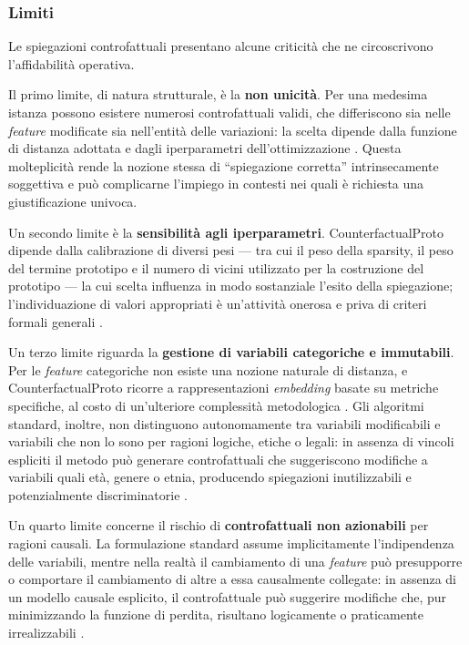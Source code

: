 \subsubsection{Limiti}

Le spiegazioni controfattuali presentano alcune criticità che ne circoscrivono l'affidabilità operativa.

Il primo limite, di natura strutturale, è la \textbf{non unicità}. Per una medesima istanza possono esistere numerosi controfattuali validi, che differiscono sia nelle \textit{feature} modificate sia nell'entità delle variazioni: la scelta dipende dalla funzione di distanza adottata e dagli iperparametri dell'ottimizzazione \cite{vanlooveren2021counterfactualproto, wachter2017counterfactual}. Questa molteplicità rende la nozione stessa di ``spiegazione corretta'' intrinsecamente soggettiva e può complicarne l'impiego in contesti nei quali è richiesta una giustificazione univoca.

Un secondo limite è la \textbf{sensibilità agli iperparametri}. CounterfactualProto dipende dalla calibrazione di diversi pesi --- tra cui il peso della sparsity, il peso del termine prototipo e il numero di vicini utilizzato per la costruzione del prototipo --- la cui scelta influenza in modo sostanziale l'esito della spiegazione; l'individuazione di valori appropriati è un'attività onerosa e priva di criteri formali generali \cite{vanlooveren2021counterfactualproto}.

Un terzo limite riguarda la \textbf{gestione di variabili categoriche e immutabili}. Per le \textit{feature} categoriche non esiste una nozione naturale di distanza, e CounterfactualProto ricorre a rappresentazioni \textit{embedding} basate su metriche specifiche, al costo di un'ulteriore complessità metodologica \cite{vanlooveren2021counterfactualproto}. Gli algoritmi standard, inoltre, non distinguono autonomamente tra variabili modificabili e variabili che non lo sono per ragioni logiche, etiche o legali: in assenza di vincoli espliciti il metodo può generare controfattuali che suggeriscono modifiche a variabili quali età, genere o etnia, producendo spiegazioni inutilizzabili e potenzialmente discriminatorie \cite{wachter2017counterfactual, vanlooveren2021counterfactualproto}.

Un quarto limite concerne il rischio di \textbf{controfattuali non azionabili} per ragioni causali. La formulazione standard assume implicitamente l'indipendenza delle variabili, mentre nella realtà il cambiamento di una \textit{feature} può presupporre o comportare il cambiamento di altre a essa causalmente collegate: in assenza di un modello causale esplicito, il controfattuale può suggerire modifiche che, pur minimizzando la funzione di perdita, risultano logicamente o praticamente irrealizzabili \cite{wachter2017counterfactual}.


